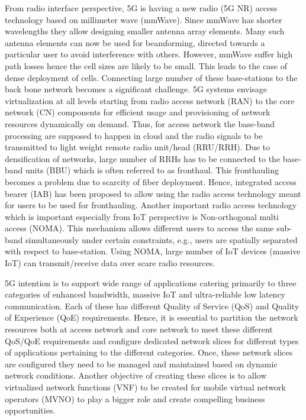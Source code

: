 \begin{multicols}{2}
From radio interface perspective, 5G is having a new radio (5G NR) access technology based on millimeter wave (mmWave). Since mmWave has shorter wavelengths they allow designing smaller antenna array elements. Many such antenna elements can now be used for beamforming, directed towards a particular user to avoid interference with others. However, mmWave suffer high path losses hence the cell sizes are likely to be small. This leads to the case of dense deployment of cells. Connecting large number of these base-stations to the back bone network becomes a significant challenge. 5G systems envisage virtualization at all levels starting from radio access network (RAN) to the core network (CN) components for efficient usage and provisioning of network resources dynamically on demand. Thus, for access network the base-band processing are supposed to happen in cloud and the radio signals to be transmitted to light weight remote radio unit/head (RRU/RRH). Due to densification of networks, large number of RRHs has to be connected to the base-band units (BBU) which is often referred to as fronthaul. This fronthauling becomes a problem due to scarcity of fiber deployment. Hence, integrated access bearer (IAB) has been proposed to allow using the radio access technology meant for users to be used for fronthauling. Another important radio access technology which is important especially from IoT perspective is Non-orthogonal multi access (NOMA). This mechanism allows different users to access the same sub-band simultaneously under certain constraints, e.g., users are spatially separated with respect to base-station. Using NOMA, large number of IoT devices (massive IoT) can transmit/receive data over scare radio resources.

5G intention is to support wide range of applications catering primarily to three categories of enhanced bandwidth, massive IoT and ultra-reliable low latency communication. Each of these has different Quality of Service (QoS) and Quality of Experience (QoE) requirements. Hence, it is essential to partition the network resources both at access network and core network to meet these different QoS/QoE requirements and configure dedicated network slices for different types of applications pertaining to the different categories. Once, these network slices are configured they need to be managed and maintained based on dynamic network conditions. Another objective of creating these slices is to allow virtualized network functions (VNF) to be created for mobile virtual network operators (MVNO) to play a bigger role and create compelling business opportunities.


\end{multicols}

